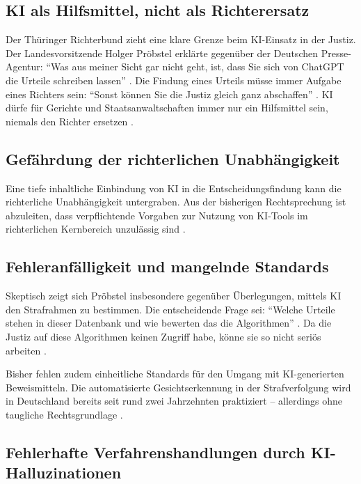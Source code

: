 \documentclass[12pt,a4paper]{article}
\begin{document}
	\subsection{KI als Hilfsmittel, nicht als Richterersatz}
	
	Der Thüringer Richterbund zieht eine klare Grenze beim KI-Einsatz in der Justiz. Der Landesvorsitzende Holger Pröbstel erklärte gegenüber der Deutschen Presse-Agentur: \enquote{Was aus meiner Sicht gar nicht geht, ist, dass Sie sich von ChatGPT die Urteile schreiben lassen} \cite{SZ2025}. Die Findung eines Urteils müsse immer Aufgabe eines Richters sein: \enquote{Sonst können Sie die Justiz gleich ganz abschaffen} \cite{SZ2025}. KI dürfe für Gerichte und Staatsanwaltschaften immer nur ein Hilfsmittel sein, niemals den Richter ersetzen \cite{SZ2025}.
	
	\subsection{Gefährdung der richterlichen Unabhängigkeit}
	
	Eine tiefe inhaltliche Einbindung von KI in die Entscheidungsfindung kann die richterliche Unabhängigkeit untergraben. Aus der bisherigen Rechtsprechung ist abzuleiten, dass verpflichtende Vorgaben zur Nutzung von KI-Tools im richterlichen Kernbereich unzulässig sind \cite{Anwaltsblatt2025}.
	
	\subsection{Fehleranfälligkeit und mangelnde Standards}
	
	Skeptisch zeigt sich Pröbstel insbesondere gegenüber Überlegungen, mittels KI den Strafrahmen zu bestimmen. Die entscheidende Frage sei: \enquote{Welche Urteile stehen in dieser Datenbank und wie bewerten das die Algorithmen} \cite{SZ2025}. Da die Justiz auf diese Algorithmen keinen Zugriff habe, könne sie so nicht seriös arbeiten \cite{SZ2025}.
	
	Bisher fehlen zudem einheitliche Standards für den Umgang mit KI-generierten Beweismitteln. Die automatisierte Gesichtserkennung in der Strafverfolgung wird in Deutschland bereits seit rund zwei Jahrzehnten praktiziert – allerdings ohne taugliche Rechtsgrundlage \cite{Nomos2025}.
	
	\subsection{Fehlerhafte Verfahrenshandlungen durch KI-Halluzinationen}
	
\end{document}
